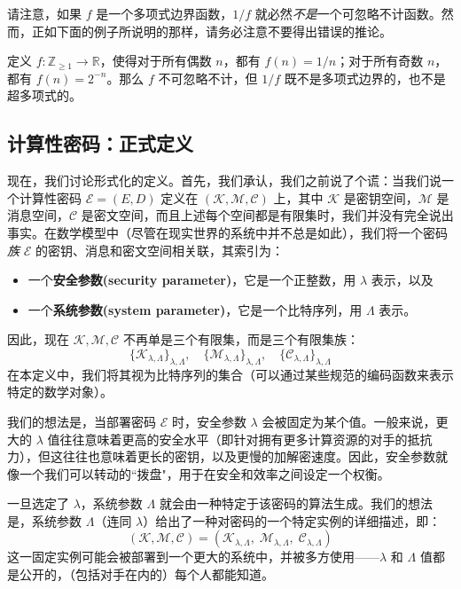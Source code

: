 请注意，如果 $f$ 是一个多项式边界函数，$1/f$ 就必然\emph{不是}一个可忽略不计函数。然而，正如下面的例子所说明的那样，请务必注意不要得出错误的推论。

\begin{example}\label{exmp:2-11}
定义 $f:\mathbb{Z}_{\geq1}\to\mathbb{R}$，使得对于所有偶数 $n$，都有 $f(n)={1}/{n}$；对于所有奇数 $n$，都有 $f(n)=2^{-n}$。那么 $f$ 不可忽略不计，但 $1/f$ 既不是多项式边界的，也不是超多项式的。
\end{example}

\subsection{计算性密码：正式定义}\label{subsec:2-3-2}

现在，我们讨论形式化的定义。首先，我们承认，我们之前说了个谎：当我们说一个计算性密码 $\mathcal{E}=(E,D)$ 定义在 $(\mathcal{K},\mathcal{M},\mathcal{C})$ 上，其中 $\mathcal{K}$ 是密钥空间，$\mathcal{M}$ 是消息空间，$\mathcal{C}$ 是密文空间，而且上述每个空间都是有限集时，我们并没有完全说出事实。在数学模型中（尽管在现实世界的系统中并不总是如此），我们将一个密码\emph{族} $\mathcal{E}$ 的密钥、消息和密文空间相关联，其索引为：
\begin{itemize}
	\item 一个\textbf{安全参数(security parameter)}，它是一个正整数，用 $\lambda$ 表示，以及
	\item 一个\textbf{系统参数(system parameter)}，它是一个比特序列，用 $\Lambda$ 表示。
\end{itemize}
因此，现在 $\mathcal{K},\mathcal{M},\mathcal{C}$ 不再单是三个有限集，而是三个有限集族：
\[
\{\mathcal{K}_{\lambda,\Lambda}\}_{\lambda,\Lambda},\quad
\{\mathcal{M}_{\lambda,\Lambda}\}_{\lambda,\Lambda},\quad
\{\mathcal{C}_{\lambda,\Lambda}\}_{\lambda,\Lambda}
\]
在本定义中，我们将其视为比特序列的集合（可以通过某些规范的编码函数来表示特定的数学对象）。

我们的想法是，当部署密码 $\mathcal{E}$ 时，安全参数 $\lambda$ 会被固定为某个值。一般来说，更大的 $\lambda$ 值往往意味着更高的安全水平（即针对拥有更多计算资源的对手的抵抗力），但这往往也意味着更长的密钥，以及更慢的加解密速度。因此，安全参数就像一个我们可以转动的``拨盘"，用于在安全和效率之间设定一个权衡。

一旦选定了 $\lambda$，系统参数 $\Lambda$ 就会由一种特定于该密码的算法生成。我们的想法是，系统参数 $\Lambda$（连同 $\lambda$）给出了一种对密码的一个特定实例的详细描述，即：
\[
(\mathcal{K},\mathcal{M},\mathcal{C})
=(
\mathcal{K}_{\lambda,\Lambda},\;
\mathcal{M}_{\lambda,\Lambda},\;
\mathcal{C}_{\lambda,\Lambda}
)
\]
这一固定实例可能会被部署到一个更大的系统中，并被多方使用——$\lambda$ 和 $\Lambda$ 值都是公开的，（包括对手在内的）每个人都能知道。

